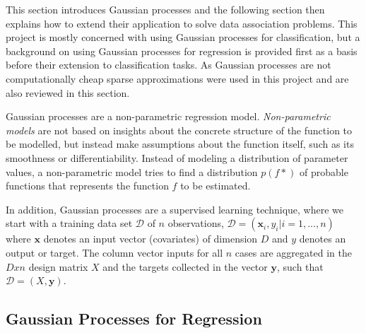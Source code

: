 \documentclass[12pt,a4paper]{report}
\theoremstyle{definition}
\begin{document}
This section introduces Gaussian processes and the following section then explains how to extend their application to solve data association problems. 
This project is mostly concerned with using Gaussian processes for classification, but a background on using Gaussian processes for regression is provided first as a basis before their extension to classification tasks. 
As Gaussian processes are not computationally cheap sparse approximations were used in this project and are also reviewed in this section.

Gaussian processes are a non-parametric regression model. 
\emph{Non-parametric models} are not based on insights about the concrete structure of the function to be modelled, but instead make assumptions about the function itself, such as its smoothness or differentiability. 
Instead of modeling a distribution of parameter values, a non-parametric model tries to find a distribution $p(f*)$ of probable functions that represents the function $f$ to be estimated.

In addition, Gaussian processes are a supervised learning technique, where we start with a training data set $\mathcal{D}$ of $n$ observations, $\mathcal{D} = (\textbf{x}_{i}, y_{i} | i = 1, ..., n)$ where $\textbf{x}$ denotes an input vector (covariates) of dimension $D$ and $y$ denotes an output or target. 
The column vector inputs for all $n$ cases are aggregated in the $D x n$ design matrix $X$ and the targets collected in the vector $\textbf{y}$, such that $\mathcal{D} = (X, \textbf{y})$.

\subsection{Gaussian Processes for Regression}



%
\end{document}
